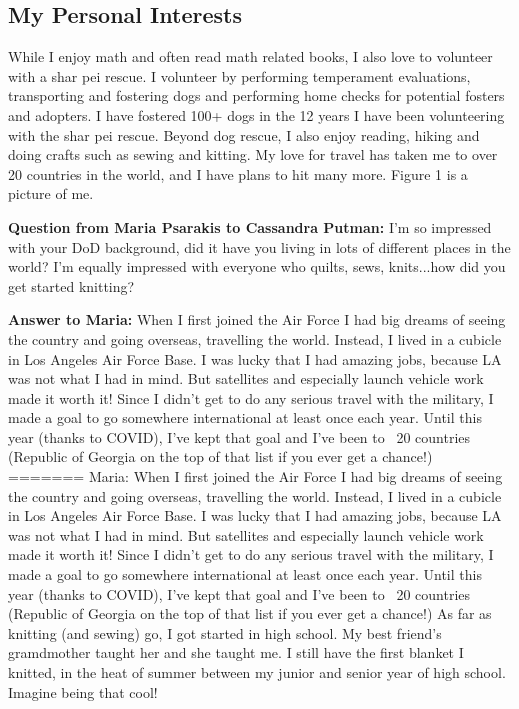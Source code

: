 \subsection{My Personal Interests}
While I enjoy math and often read math related books, I also love to volunteer with a shar pei rescue.  I volunteer by performing temperament evaluations, transporting and fostering dogs and  performing home checks for potential fosters and adopters.  I have fostered 100+ dogs in the 12 years I have been volunteering with the shar pei rescue.  Beyond dog rescue, I also enjoy reading, hiking and doing crafts such as sewing and kitting. My love for travel has taken me to over 20 countries in the world, and I have plans to hit many more.  Figure 1 is a picture of me.

\textbf{Question from Maria Psarakis to Cassandra Putman:} I'm so impressed with your DoD background, did it have you living in lots of different places in the world? I'm equally impressed with everyone who quilts, sews, knits...how did you get started knitting? 

\textbf{Answer to Maria:} When I first joined the Air Force I had big dreams of seeing the country and going overseas, travelling the world.  Instead, I lived in a cubicle in Los Angeles Air Force Base. I was lucky that I had amazing jobs, because LA was not what I had in mind.  But satellites and especially launch vehicle work made it worth it!  Since I didn't get to do any serious travel with the military, I made a goal to go somewhere international at least once each year.  Until this year (thanks to COVID), I've kept that goal and I've been to ~20 countries (Republic of Georgia on the top of that list if you ever get a chance!) 
=======
Maria: When I first joined the Air Force I had big dreams of seeing the country and going overseas, travelling the world.  Instead, I lived in a cubicle in Los Angeles Air Force Base. I was lucky that I had amazing jobs, because LA was not what I had in mind.  But satellites and especially launch vehicle work made it worth it!  Since I didn't get to do any serious travel with the military, I made a goal to go somewhere international at least once each year.  Until this year (thanks to COVID), I've kept that goal and I've been to ~20 countries (Republic of Georgia on the top of that list if you ever get a chance!) 
As far as knitting (and sewing) go, I got started in high school. My best friend's gramdmother taught her and she taught me. I still have the first blanket I knitted, in the heat of summer between my junior and senior year of high school. Imagine being that cool! 
